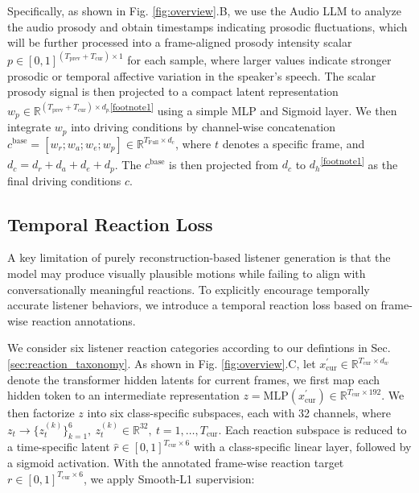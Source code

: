 Specifically, as shown in Fig. \ref{fig:overview}.B, we use the Audio LLM \cite{Qwen2-Audio} to analyze the audio prosody and obtain timestamps indicating prosodic fluctuations, which will be further processed into a frame-aligned prosody intensity scalar $p\in[0,1]^{(T_{\text{prev}}+T_{\text{cur}})\times 1}$ for each sample, where larger values indicate stronger prosodic or temporal affective variation in the speaker's speech. The scalar prosody signal is then projected to a compact latent representation $w_{p}\in\mathbb{R}^{(T_{\text{prev}}+T_{\text{cur}})\times d_{p}}$\textsuperscript{\ref{footnote1}} using a simple MLP and Sigmoid layer.
We then integrate $w_{p}$ into driving conditions by channel-wise concatenation $c^{\text{base}}=[w_{r};w_{a};w_{e};w_{p}]\in\mathbb{R}^{T_{\text{Full}}\times d_c}$, where $t$ denotes a specific frame, and $d_c=d_r+d_a+d_e+d_{p}$. The $c^{\text{base}}$ is then projected from $d_c$ to $d_h$\textsuperscript{\ref{footnote1}} as the final driving conditions $c$.





\subsection{Temporal Reaction Loss}

A key limitation of purely reconstruction-based listener generation is that the model may produce visually plausible motions while failing to align with conversationally meaningful reactions. To explicitly encourage temporally accurate listener behaviors, we introduce a temporal reaction loss based on frame-wise reaction annotations.

We consider six listener reaction categories according to our defintions in Sec. \ref{sec:reaction_taxonomy}. As shown in Fig. \ref{fig:overview}.C, let $x^{\prime}_{\text{cur}}\in\mathbb{R}^{T_{\text{cur}}\times d_w}$ denote the transformer hidden latents for current frames, we first map each hidden token to an intermediate representation $z=\mathrm{MLP}(x^{\prime}_{\text{cur}})\in\mathbb{R}^{T_{\text{cur}}\times192}$. We then factorize $z$ into six class-specific subspaces, each with 32 channels, where $z_t \rightarrow \{z_t^{(k)}\}_{k=1}^{6},\ z_t^{(k)}\in\mathbb{R}^{32},\ t=1,\dots,T_{\text{cur}}$. Each reaction subspace is reduced to a time-specific latent $\hat{r}\in[0,1]^{T_{\text{cur}}\times6}$ with a class-specific linear layer, followed by a sigmoid activation. With the annotated frame-wise reaction target $r\in[0,1]^{T_{\text{cur}}\times6}$, we apply Smooth-L1 supervision:

